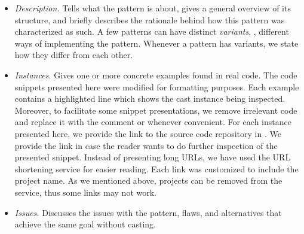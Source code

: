 \begin{itemize}

\item \textit{Description.}
Tells what the pattern is about, gives a general overview of its structure, and
briefly describes the rationale behind how this pattern was characterized as such.
A few patterns can have distinct \emph{variants}, \ie,
different ways of implementing the pattern.
Whenever a pattern has variants,
we state how they differ from each other.

\item \textit{Instances.}
Gives one or more concrete examples found in real code.
The code snippets presented here were modified for formatting purposes.
Each example contains a highlighted line which shows the cast instance being inspected.
Moreover, to facilitate some snippet presentations,
we remove irrelevant code and replace it with the comment
\code{// [...]} or \code{/* [...] */} whenever convenient.
For each instance presented here,
we provide the link to the source code repository in \lgtm{}.
We provide the link in case the reader wants to do further inspection of the presented snippet.
Instead of presenting long \lgtm{} URLs,
we have used the URL shortening service
\href{https://bitly.com/}{\bitly} for easier reading.
Each \bitly{} link was customized to include the project name.
As we mentioned above, projects can be removed from the \lgtm{} service,
thus some links may not work.

\item \textit{Issues.}
Discusses the issues with the pattern, flaws, and alternatives that achieve the same goal without casting.

\end{itemize}


\newcommand\castpatternsection[1]{\paragraph{#1.}}
\newcommand\variant[1]{\textsl{#1}}
\newenvironment{pattern}[1]{
\newcommand{\nocc}{\csname n#1Pattern\endcsname{}}
\newcommand{\noccsrc}{\csname n#1PatternSrc\endcsname{}}
\newcommand{\noccgen}{\csname n#1PatternGen\endcsname{}}
\newcommand{\nocctest}{\csname n#1PatternTest\endcsname{}}
\newcommand{\pocc}{\csname p#1Pattern\endcsname{}}
\newcommand{\instances}{\castpatternsection{Instances: \nocc{} (\pocc\%)}
    We found \noccsrc{} in application code,
    \nocctest{} in test code,
    and \noccgen{} in generated code.}
\newcommand{\issues}{\castpatternsection{Issues}}
\newcommand{\thisp}{\textsc{#1}}
\subsection{\textsc{#1}}
\label{pat:#1}
\castpatternsection{Description}
}{}

